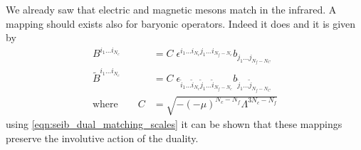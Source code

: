 We already saw that electric and magnetic mesons match in the infrared. 
A mapping should exists also for baryonic operators. Indeed it does and it is given by
\begin{equation}
\begin{aligned}
 B^{i_1 \dots i_{N_c}} & = C \; \epsilon^{i_1 \dots i_{N_c} j_1 \dots i_{N_f - N_c}} b_{j_1 \dots j_{N_f - N_C}}\\
 \tilde{B}^{i_1 \dots i_{N_c}} &= C \; \epsilon_{\tilde{i}_1 \dots \tilde{i}_{N_c} \tilde{j}_1 \dots \tilde{i}_{N_f - N_c}} b_{ \tilde{j}_1 \dots \tilde{j}_{N_f - N_C}}\\
 \text{where} \qquad C & = \sqrt{ - (-\mu)^{N_c - N_f} \Lambda^{3 N_c - N_f}}
\end{aligned}
\end{equation}
using \eqref{eqn:seib_dual_matching_scales} it can be shown that these mappings preserve the involutive action of the duality. 

